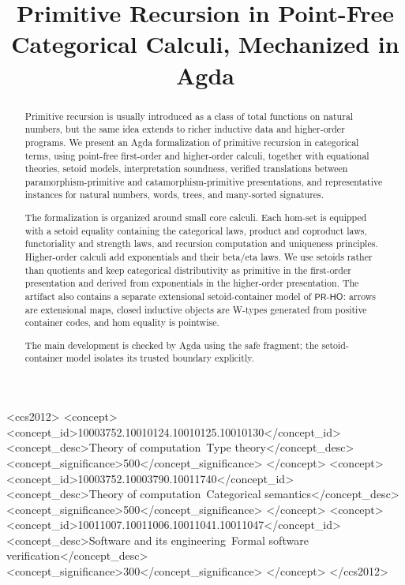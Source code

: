 \documentclass[sigplan,10pt,anonymous,review,screen]{acmart}
\newcommand{\PRHO}{\ensuremath{\mathsf{PR\mbox{-}HO}}}
\begin{document}
\title{Primitive Recursion in Point-Free Categorical Calculi, Mechanized in Agda}

%
%
%
%
%

\begin{abstract}
Primitive recursion is usually introduced as a class of total functions
on natural numbers, but the same idea extends to richer inductive data
and higher-order programs.  We present an Agda formalization of
primitive recursion in categorical terms, using point-free first-order
and higher-order calculi, together with equational theories, setoid
models, interpretation soundness, verified translations between
paramorphism-primitive and catamorphism-primitive presentations, and
representative instances for natural numbers, words, trees, and
many-sorted signatures.

The formalization is organized around small core calculi.  Each hom-set
is equipped with a setoid equality containing the categorical laws,
product and coproduct laws, functoriality and strength laws, and
recursion computation and uniqueness principles.  Higher-order calculi
add exponentials and their beta/eta laws.  We use setoids rather than
quotients and keep categorical distributivity as
primitive in the first-order presentation and derived from exponentials
in the higher-order presentation.  The artifact also contains a
separate extensional setoid-container model of \PRHO{}: arrows are
extensional maps, closed inductive objects are W-types generated from
positive container codes, and hom equality is pointwise.

The main development is checked by Agda using the safe fragment; the
setoid-container model isolates its trusted boundary explicitly.
\end{abstract}

\begin{CCSXML}
<ccs2012>
 <concept>
  <concept_id>10003752.10010124.10010125.10010130</concept_id>
  <concept_desc>Theory of computation~Type theory</concept_desc>
  <concept_significance>500</concept_significance>
 </concept>
 <concept>
  <concept_id>10003752.10003790.10011740</concept_id>
  <concept_desc>Theory of computation~Categorical semantics</concept_desc>
  <concept_significance>500</concept_significance>
 </concept>
 <concept>
  <concept_id>10011007.10011006.10011041.10011047</concept_id>
  <concept_desc>Software and its engineering~Formal software verification</concept_desc>
  <concept_significance>300</concept_significance>
 </concept>
</ccs2012>
\end{CCSXML}
\end{document}
